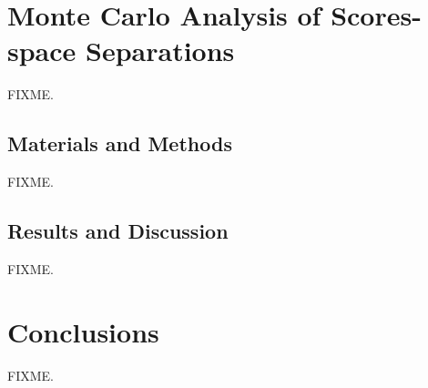 \section{Monte Carlo Analysis of Scores-space Separations}

\begin{doublespace}
FIXME.
\end{doublespace}

\subsection{Materials and Methods}

\begin{doublespace}
FIXME.
\end{doublespace}

\subsection{Results and Discussion}

\begin{doublespace}
FIXME.
\end{doublespace}

\section{Conclusions}

\begin{doublespace}
FIXME.
\end{doublespace}





